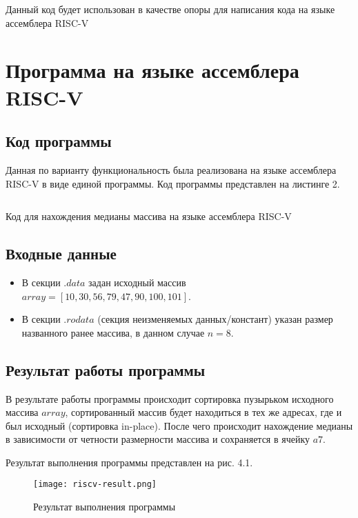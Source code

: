 Данный код будет использован в качестве опоры для написания кода на языке ассемблера RISC-V

\section{Программа на языке ассемблера RISC-V}

\subsection{Код программы}
Данная по варианту функциональность была реализована на языке ассемблера RISC-V в виде единой программы. Код программы представлен на листинге 2.

\begin{code}
	\inputminted[breaklines=true, xleftmargin=1em, linenos, frame=single, framesep=10pt, fontsize=\footnotesize, firstline=1]{asm}{listings/full/median_full.s}
	\caption{Код для нахождения медианы массива на языке ассемблера RISC-V}
\end{code}

\subsection{Входные данные}

\begin{itemize}
	\item В секции \(.data\) задан исходный массив \(array = [10, 30, 56, 79, 47, 90, 100, 101]\).
	\item В секции \(.rodata\) (секция неизменяемых данных/констант) указан размер названного ранее массива, в данном случае \(n = 8\).
\end{itemize}

\subsection{Результат работы программы}
В результате работы программы происходит сортировка пузырьком исходного массива \(array\), сортированный массив будет находиться в тех же адресах, где и был исходный (сортировка in-place). После чего происходит нахождение медианы в зависимости от четности размерности массива и сохраняется в ячейку \(a7\).

Результат выполнения программы представлен на рис. 4.1.

\begin{figure}[H]
	\centering
	\texttt{[image: riscv-result.png]}
	\caption{Результат выполнения программы}
\end{figure}

